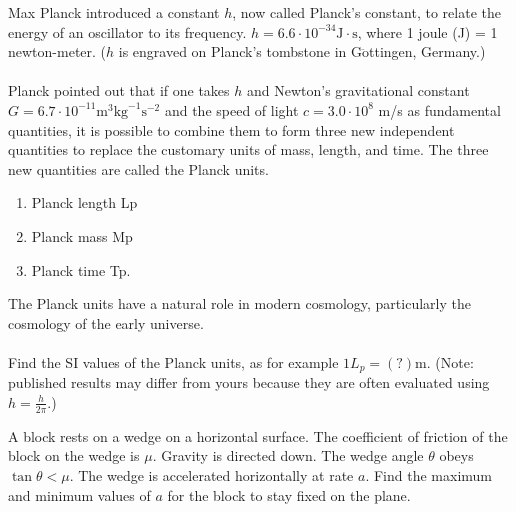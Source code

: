 \documentclass[12pt,letterpaper]{hmcpset}
\begin{document}
\begin{problem}[2.16]

	Max Planck introduced a constant $h$, now called Planck's constant, to relate the energy of an oscillator to its frequency. $h = 6.6 \cdot 10^{-34} \text{J} \cdot \text{s}$, where 1 joule (J) = 1 newton-meter. ($h$ is engraved on Planck's tombstone in G$\ddot{\text{o}}$ttingen, Germany.)
	\\\\
	Planck pointed out that if one takes $h$ and Newton's gravitational constant $G = 6.7 \cdot 10^{-11} \text{m}^3 \text{kg}^{-1} \text{s}^{-2}$ and the speed of light $c = 3.0 \cdot 10^8$ m/s as fundamental quantities, it is possible to combine them to form three new independent quantities to replace the customary units of mass, length, and time. The three new quantities are called the Planck units.
	\begin{enumerate}
		\item Planck length Lp
		\item Planck mass Mp
		\item Planck time Tp.
	\end{enumerate}
	The Planck units have a natural role in modern cosmology, particularly the cosmology of the early universe.
	\\\\
	Find the SI values of the Planck units, as for example $1L_p =(?)$m. (Note: published results may differ from yours because they are often evaluated using $h = \frac{h}{2\pi}$.)

\end{problem}

\begin{solution}
	\vfill
\end{solution}
\newpage

\begin{problem}[2.17]

	A block rests on a wedge on a horizontal surface. The coefficient of friction of the block on the wedge is $\mu$. Gravity is directed down. The wedge angle $\theta$ obeys $\tan \theta < \mu$. The wedge is accelerated horizontally at rate $a$. Find the maximum and minimum values of $a$ for the block to stay fixed on the plane.

\end{problem}

\begin{solution}
	\vfill
\end{solution}
\newpage
\end{document}
